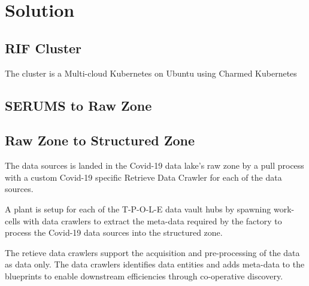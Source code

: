 {\color{red}{VJ:
Section 3 - Impact of Problems with Sharing Medical Information in Time of COVID-19: Here we elaborate what the problem is. This is a more detailed description of the problem, probably with more graphs.
}}

\section{Solution}

\subsection{RIF Cluster}

The cluster is a Multi-cloud Kubernetes on Ubuntu using Charmed Kubernetes 

{\color{red}{AFV:
Need some help here!!
I suggest we use the SEPA papers fig 6 as a guide but I need Docker replaced with kubernetes
The data processing should expand downwards into a secondary row of servers with following items.
- Server 1 - RaptorQube for SERUMS
- server 2 - Dask Scheduler server
- Servers 3 - 51 - i.e 48 smaller dask workers
}}

\subsection{SERUMS to Raw Zone}

{\color{red}{AFV:
Need some help here!!
I suggest we use the SEPA papers fig 2 and Fig 4 as a guide

TW: figures uploaded on images;sepa-paper need remodeling then...- juanjo has the lucid chart files }

}



\subsection{Raw Zone to Structured Zone}

The data sources is landed in the Covid-19 data lake's raw zone by a pull process with a custom Covid-19 specific Retrieve Data Crawler for each of the data sources.

A plant is setup for each of the T-P-O-L-E data vault hubs by spawning work-cells with data crawlers to extract the meta-data required by the factory to process the Covid-19 data sources into the structured zone.

The retieve data crawlers \cite{Vermeulen2018ret} support the acquisition and pre-processing of the data as data only. The data crawlers identifies data entities and adds meta-data to the blueprints to enable downstream efficiencies through co-operative discovery.

